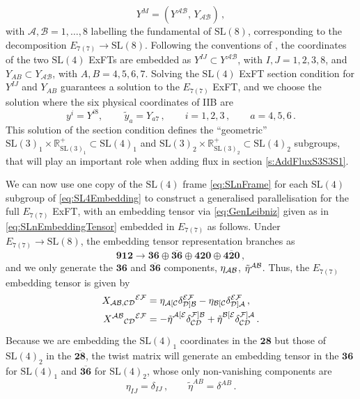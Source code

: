 \documentclass[a4paper, 11pt]{article}
\numberwithin{equation}{section}
\newcommand{\SL}[1]{\mathrm{SL}( #1 )}
\newcommand{\En}[1]{E_{#1(#1)}}
\newcommand{\+}{\oplus}
\newcommand{\cA}{\mathcal{A}}
\newcommand{\cB}{\mathcal{B}}
\newcommand{\cC}{\mathcal{C}}
\newcommand{\RO}{\mathbb{R}^+_{\SL{3}_1}}
\newcommand{\RT}{\mathbb{R}^+_{\SL{3}_2}}
\begin{document}
\begin{equation}
	Y^M = \left( Y^{\cA\cB} ,\, Y_{\cA\cB} \right) \,,
\end{equation}
with $\cA, \cB = 1, \ldots, 8$ labelling the fundamental of $\SL{8}$, corresponding to the decomposition $\En{7} \rightarrow \SL{8}$. Following the conventions of \cite{Inverso:2016eet}, the coordinates of the two $\SL{4}$ ExFTs are embedded as $Y^{IJ} \subset Y^{\cA\cB}$, with $I, J = 1, 2, 3, 8$, and $Y_{AB} \subset Y_{\cA\cB}$, with $A, B = 4, 5, 6, 7$. Solving the $\SL{4}$ ExFT section condition for $Y^{IJ}$ and $Y_{AB}$ guarantees a solution to the $\En{7}$ ExFT, and we choose the solution where the six physical coordinates of IIB are
\begin{equation} \label{eq:PhysicalCoords}
	y^i = Y^{i8},\, \qquad \tilde{y}_a = Y_{a7} \,, \qquad i = 1, 2, 3 \,, \qquad a = 4, 5, 6 \,.
\end{equation}
This solution of the section condition defines the ``geometric'' $\SL{3}_1 \times \RO \subset \SL{4}_1$ and $\SL{3}_2 \times \RT \subset \SL{4}_2$ subgroups, that will play an important role when adding flux in section \ref{s:AddFluxS3S3S1}.

We can now use one copy of the $\SL{4}$ frame \eqref{eq:SLnFrame} for each $\SL{4}$ subgroup of \eqref{eq:SL4Embedding} to construct a generalised parallelisation for the full $\En{7}$ ExFT, with an embedding tensor via \eqref{eq:GenLeibniz} given as in \eqref{eq:SLnEmbeddingTensor} embedded in $\En{7}$ as follows. Under $\En{7} \rightarrow \SL{8}$, the embedding tensor representation branches as
\begin{equation}
	\mathbf{912} \rightarrow \mathbf{36} \oplus \overline{\mathbf{36}} \oplus \mathbf{420} \oplus \overline{\mathbf{420}} \,,
\end{equation}
and we only generate the $\mathbf{36}$ and $\overline{\mathbf{36}}$ components, $\eta_{{\cal AB}}$, $\tilde{\eta}^{{\cal AB}}$. Thus, the $\En{7}$ embedding tensor is given by
\begin{equation}
	\begin{split}
		X_{{\cal AB, CD}}{}^{\cal EF} &= \eta_{\cA[\cC} \delta_{{\cal D}]\cB}^{{\cal EF}} - \eta_{\cB[\cC} \delta_{{\cal D}]\cA}^{{\cal EF}} \,, \\
		X^{{\cal AB}}{}_{{\cal CD}}{}^{\cal EF} &= -\tilde{\eta}^{\cA[{\cal E}}_{\phantom{[\cA]}} \delta_{\cC{\cal D}}^{{\cal F}]{\cal B}} + \tilde{\eta}^{\cB[{\cal E}}_{\phantom{[\cA]}} \delta_{\cC{\cal D}}^{{\cal F}]{\cal A}} \,.
	\end{split}
\end{equation}
Because we are embedding the $\SL{4}_1$ coordinates in the $\mathbf{28}$ but those of $\SL{4}_2$ in the $\overline{\mathbf{28}}$, the twist matrix will generate an embedding tensor in the $\mathbf{36}$ for $\SL{4}_1$ and $\overline{\mathbf{36}}$ for $\SL{4}_2$, whose only non-vanishing components are
\begin{equation}
	\eta_{IJ} = \delta_{IJ} \,, \qquad \tilde{\eta}^{AB} = \delta^{AB} \,.
\end{equation}
\end{document}
